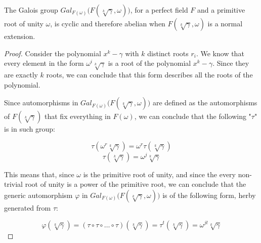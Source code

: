 \begin{lemma}
\label{lem:FOmegaGammaSolvable}
    The Galois group $Gal_{F(\omega)}\big(F(\sqrt[k]{\gamma}, \omega)\big)$, for a perfect 
    field $F$ and a primitive root of unity $\omega$, is cyclic and therefore abelian 
    when $F(\sqrt[k]{\gamma}, \omega)$ is a normal extension.
\end{lemma}
\begin{proof}
    Consider the polynomial $x^k - \gamma$ with $k$ distinct roots $r_i$. We know 
    that every element in the form $\omega^i\sqrt[k]{\gamma}$ is a root of the
    polynomial $x^k - \gamma$. Since they are exactly $k$ roots, we can
    conclude that this form describes all the roots of the polynomial. 

    Since automorphisms in $Gal_{F(\omega)}\big(F(\sqrt[k]{\gamma}, \omega)\big)$
    are defined as the automorphisms of $F(\sqrt[k]{\gamma})$ that fix everything in 
    $F(\omega)$, we can conclude that the following "$\tau$" is in such group:

    $$ \tau(\omega^r\sqrt[k]{\gamma}) = \omega^r\tau(\sqrt[k]{\gamma}) $$
    $$ \tau(\sqrt[k]{\gamma}) = \omega^j\sqrt[k]{\gamma} $$
    \vspace{0.2em}

    This means that, since $\omega$ is the primitive root of unity, and since the 
    every non-trivial root of unity is a power of the primitive root, we can conclude that
    the generic automorphism $\varphi$ in $Gal_{F(\omega)}\big(F(\sqrt[k]{\gamma}, \omega)\big)$ is
    of the following form, herby generated from $\tau$:

    $$ \varphi(\sqrt[k]{\gamma}) = (\tau \circ \tau \circ \dots \circ \tau)(\sqrt[k]{\gamma}) 
    = \tau^{t}(\sqrt[k]{\gamma}) = \omega^{jt}\sqrt[k]{\gamma} $$

\end{proof}

\newpage

